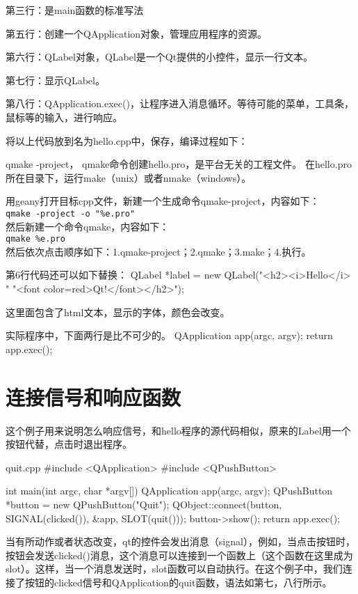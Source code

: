 \documentclass[11pt,oneside]{book}
\begin{document}
\begin{common-format}
第三行：是main函数的标准写法

第五行：创建一个QApplication对象，管理应用程序的资源。

第六行：QLabel对象，QLabel是一个Qt提供的小控件，显示一行文本。

第七行：显示QLabel。

第八行：QApplication.exec()，让程序进入消息循环。等待可能的菜单，工具条，鼠标等的输入，进行响应。

将以上代码放到名为hello.cpp中，保存，编译过程如下：

qmake -project，
qmake命令创建hello.pro，是平台无关的工程文件。
在hello.pro所在目录下，运行make（unix）或者nmake（windows）。

用geany打开目标cpp文件，新建一个生成命令qmake-project，内容如下：\\
\verb+qmake -project -o "%e.pro"+\\
然后新建一个命令qmake，内容如下：\\
\verb+qmake %e.pro+\\
然后依次点击顺序如下：1.qmake-project；2.qmake；3.make；4.执行。

第6行代码还可以如下替换：
QLabel *label = new QLabel("<h2><i>Hello</i> "
                           "<font color=red>Qt!</font></h2>");
                           
这里面包含了html文本，显示的字体，颜色会改变。 

实际程序中，下面两行是比不可少的。
QApplication app(argc, argv);
return app.exec();

\section{连接信号和响应函数}
这个例子用来说明怎么响应信号，和hello程序的源代码相似，原来的Label用一个按钮代替，点击时退出程序。
\begin{xverbatim}{quit.cpp}
#include <QApplication>
#include <QPushButton>

int main(int argc, char *argv[])
{
    QApplication app(argc, argv);
    QPushButton *button = new QPushButton("Quit");
    QObject::connect(button, SIGNAL(clicked()),
                     &app, SLOT(quit()));
    button->show();
    return app.exec();
}
\end{xverbatim}

当有所动作或者状态改变，qt的控件会发出消息（signal），例如，当点击按钮时，按钮会发送clicked()消息，这个消息可以连接到一个函数上（这个函数在这里成为slot）。这样，当一个消息发送时，slot函数可以自动执行。在这个例子中，我们连接了按钮的clicked信号和QApplication的quit函数，语法如第七，八行所示。


\end{common-format}
\end{document}
